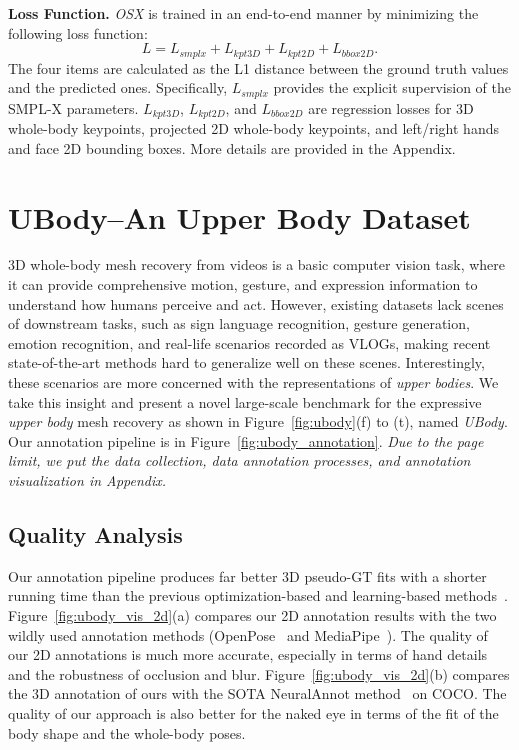 \documentclass[10pt,twocolumn,letterpaper]{article}
\newcommand{\modelname}{\emph{OSX}\xspace}
\newcommand{\dataname}{\emph{UBody}\xspace}
\begin{document}
\noindent \textbf{Loss Function.}
\modelname is trained in an end-to-end manner by minimizing the following loss function:
\begin{equation}
    L = L_{smplx} + L_{kpt3D} + L_{kpt2D} +L_{bbox2D}.
    \label{eq:loss}
\end{equation}
The four items are calculated as the L1 distance between the ground truth values and the predicted ones. Specifically, $L_{smplx}$ provides the explicit supervision of the SMPL-X parameters. $L_{kpt3D}$, $L_{kpt2D}$, and $L_{bbox2D}$ are regression losses for 3D whole-body keypoints, projected 2D whole-body keypoints, and left/right hands and face 2D bounding boxes. More details are provided in the Appendix. 

\section{UBody--An Upper Body Dataset}
\label{sec:ubody}


3D whole-body mesh recovery from videos is a basic computer vision task, where it can provide comprehensive motion, gesture, and expression information to understand how humans perceive and act.
However, existing datasets lack scenes of downstream tasks, such as sign language recognition, gesture generation, emotion recognition, and real-life scenarios recorded as VLOGs, making recent state-of-the-art methods hard to generalize well on these scenes.
Interestingly, these scenarios are more concerned with the representations of \emph{upper bodies}.
We take this insight and present a novel large-scale benchmark for the expressive \emph{upper body} mesh recovery as shown in Figure~\ref{fig:ubody}(f) to (t), named \dataname. Our annotation pipeline is in Figure~\ref{fig:ubody_annotation}.
\emph{Due to the page limit, we put the data collection, data annotation processes, and annotation visualization in Appendix.} 

\subsection{Quality Analysis}
\label{sec:ubody_quality}

Our annotation pipeline produces far better 3D pseudo-GT fits with a shorter running time than the previous optimization-based and learning-based methods~\cite{HanbyulJoo2022eft,Feng_2021_pixie,Pavlakos_2019smplx,Moon_2022NeuralAnnot,pavlakos2022multishot}.
Figure~\ref{fig:ubody_vis_2d}(a) compares our 2D annotation results with the two wildly used annotation methods (OpenPose~\cite{ZheCao2018OpenPoseRM} and MediaPipe~\cite{FanZhang2020MediaPipeHO}). The quality of our 2D annotations is much more accurate, especially in terms of hand details and the robustness of occlusion and blur.
Figure~\ref{fig:ubody_vis_2d}(b) compares the 3D annotation of ours with the SOTA NeuralAnnot method~\cite{Moon_2022NeuralAnnot} on COCO. The quality of our approach is also better for the naked eye in terms of the fit of the body shape and the whole-body poses.
\end{document}
